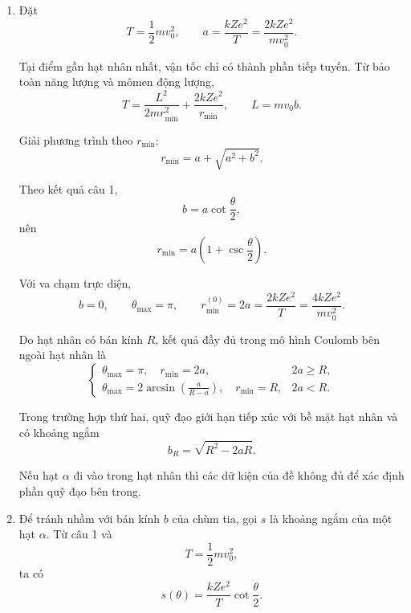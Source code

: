 \documentclass[12pt,a4paper]{article}
\begin{document}
\begin{enumerate}[leftmargin=*,itemsep=1em]
\begin{center}
\end{center}

\item
Đặt
$$
T=\frac12mv_0^2,
\qquad
a=\frac{kZe^2}{T}=\frac{2kZe^2}{mv_0^2}.
$$

Tại điểm gần hạt nhân nhất, vận tốc chỉ có thành phần tiếp tuyến. Từ bảo toàn
năng lượng và mômen động lượng,
$$
T=\frac{L^2}{2mr_{\min}^2}+\frac{2kZe^2}{r_{\min}},
\qquad
L=mv_0b.
$$

Giải phương trình theo $r_{\min}$:
$$
r_{\min}=a+\sqrt{a^2+b^2}.
$$

Theo kết quả câu 1,
$$
b=a\cot\frac{\theta}{2},
$$
nên
$$
\boxed{r_{\min}
=a\left(1+\csc\frac{\theta}{2}\right)}.
$$

Với va chạm trực diện,
$$
b=0,
\qquad
\theta_{\max}=\pi,
\qquad
r_{\min}^{(0)}=2a
=\frac{2kZe^2}{T}
=\frac{4kZe^2}{mv_0^2}.
$$

Do hạt nhân có bán kính $R$, kết quả đầy đủ trong mô hình Coulomb bên ngoài hạt
nhân là
$$
\boxed{
\begin{cases}
\theta_{\max}=\pi,
\quad r_{\min}=2a,
& 2a\ge R,\\[2mm]
\displaystyle
\theta_{\max}=2\arcsin\!\left(\frac{a}{R-a}\right),
\quad r_{\min}=R,
& 2a<R.
\end{cases}}
$$

Trong trường hợp thứ hai, quỹ đạo giới hạn tiếp xúc với bề mặt hạt nhân và có
khoảng ngắm
$$
b_R=\sqrt{R^2-2aR}.
$$

Nếu hạt $\alpha$ đi vào trong hạt nhân thì các dữ kiện của đề không đủ để xác
định phần quỹ đạo bên trong.

\item
Để tránh nhầm với bán kính $b$ của chùm tia, gọi $s$ là khoảng ngắm của một hạt
$\alpha$. Từ câu 1 và
$$
T=\frac12mv_0^2,
$$
ta có
$$
s(\theta)=\frac{kZe^2}{T}\cot\frac{\theta}{2}.
$$


\end{enumerate}
\end{document}
